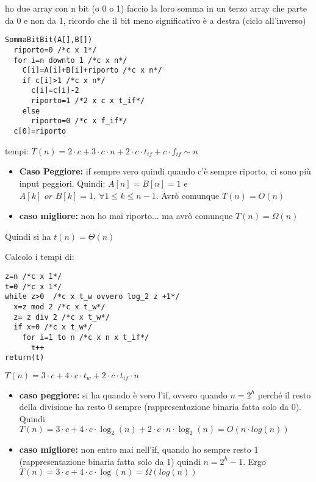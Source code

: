\documentclass[a4paper,12pt,oneside,tikz]{book}
\begin{document}
\begin{esercizio}
	ho due array con n bit (o 0 o 1) faccio la loro somma in un terzo array
	che parte da 0 e non da 1, ricordo che il bit meno significativo è a  destra (ciclo all'inverso)
	\begin{verbatim}
SommaBitBit(A[],B[])
  riporto=0 /*c x 1*/
  for i=n downto 1 /*c x n*/
    C[i]=A[i]+B[i]+riporto /*c x n*/
    if c[i]>1 /*c x n*/ 
      c[i]=c[i]-2
      riporto=1 /*2 x c x t_if*/
    else 
      riporto=0 /*c x f_if*/
  c[0]=riporto
\end{verbatim}
	tempi: $T(n)=2\cdot c+3\cdot c\cdot n+ 2\cdot c\cdot t_{if}+c\cdot f_{if}\sim n$
	\begin{itemize}
		\item \textbf{Caso Peggiore:} if sempre vero quindi quando c'è sempre riporto, ci sono più input peggiori. Quindi: $A[n]=B[n]=1$ e  $A[k] \,\, or\,\, B[k]=1,\ \forall 1\leq k\leq n-1$. Avrò comunque $T(n)=O(n)$
		\item \textbf{caso migliore:} non ho mai riporto... ma avrò comunque $T(n)=\Omega(n)$
	\end{itemize}
	Quindi si ha $t(n)=\Theta(n)$
\end{esercizio}
\begin{esercizio}
	Calcolo i tempi di:
	\begin{verbatim}
z=n /*c x 1*/
t=0 /*c x 1*/
while z>0  /*c x t_w ovvero log_2 z +1*/
  x=z mod 2 /*c x t_w*/
  z= z div 2 /*c x t_w*/
  if x=0 /*c x t_w*/
    for i=1 to n /*c x n x t_if*/
      t++
return(t)
\end{verbatim}
	$T(n)=3\cdot c+4\cdot c\cdot t_{w}+2\cdot c\cdot t_{if}\cdot n$
	\begin{itemize}
		\item \textbf{caso peggiore:} si ha quando è vero l'if, ovvero quando $n=2^h$ perché il resto della divisione ha resto 0 sempre (rappresentazione binaria fatta solo da 0). Quindi $T(n)=3\cdot c+4\cdot c\cdot \log_2 (n) +2\cdot c\cdot n\cdot \log_2(n)=O(n\cdot log (n))$
		\item \textbf{caso migliore:} non entro mai nell'if, quando ho sempre resto 1 (rappresentazione binaria fatta solo da 1) quindi $n=2^h-1$. Ergo $T(n)=3\cdot c+4\cdot c\cdot \log (n)=\Omega( log (n))$
	\end{itemize}
\end{esercizio}
\end{document}
